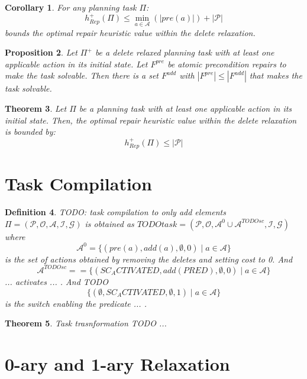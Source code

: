 \documentclass[twocolumn]{article}
\newcommand{\task}{\ensuremath{\Pi}\xspace}
\newcommand{\preds}{\ensuremath{\mathcal{P}}\xspace}
\newcommand{\acts}{\ensuremath{\mathcal{A}}\xspace}
\newcommand{\objects}{\ensuremath{\mathcal{O}}\xspace}
\newcommand{\init}{\ensuremath{\mathcal{I}}\xspace}
\newcommand{\goal}{\ensuremath{\mathcal{G}}\xspace}
\newcommand{\prename}{\ensuremath{pre}\xspace}
\newcommand{\addname}{\ensuremath{add}\xspace}
\newcommand{\pre}[1]{\ensuremath{\prename(#1)}\xspace}
\newcommand{\add}[1]{\ensuremath{\addname(#1)}\xspace}
\newcommand{\arity}[1]{\ensuremath{|#1|}}
\newcommand{\fixPre}{\ensuremath{F^{\prename}}\xspace}
\newcommand{\fixAdd}{\ensuremath{F^{\addname}}\xspace}
\newcommand{\someAct}{\ensuremath{a}\xspace}
\newcommand{\optimalHeuristicRel}{\ensuremath{h^{+}_{Rep}}\xspace}
\newcommand{\relaxedTask}{\ensuremath{\task^{+}}\xspace}
\newtheorem{theorem}{Theorem}
\newtheorem{proposition}[theorem]{Proposition}
\newtheorem{corollary}[theorem]{Corollary}
\newtheorem{definition}[theorem]{Definition}
\begin{document}
	
	\begin{corollary}
		For any planning task \task:
		$$\optimalHeuristicRel(\task) \leq \min_{\someAct \in \acts}(\arity{\pre{\someAct}}) + \arity{\preds}$$
		bounds the optimal repair heuristic value within the delete relaxation.
	\end{corollary}
	
	\begin{proposition}
		Let \relaxedTask be a delete relaxed planning task with at least one applicable action in its initial state.
		Let \fixPre be atomic precondition repairs to make the task solvable.
		Then there is a set \fixAdd with $\arity{\fixPre} \leq \arity{\fixAdd}$ that makes the task solvable.
	\end{proposition}
	
	
	\begin{theorem}
		Let \task be a planning task with at least one applicable action in its initial state.
		Then, the optimal repair heuristic value within the delete relaxation is bounded by:
		$$\optimalHeuristicRel(\task) \leq  \arity{\preds}$$
	\end{theorem}
	
	
	
	\section{Task Compilation}
	
	
	\begin{definition}
		
		TODO: task compilation to only add elements 
		$\task = (\preds, \objects, \acts, \init, \goal)$
		is obtained as
		$TODOtask = (\preds, \objects, \acts^0 \cup \acts^{TODOsc}, \init, \goal)$
		where 
		$$
		\acts^0 = \{
		(\pre{\someAct}, \add{\someAct}, \emptyset, 0) \mid \someAct \in \acts
		\}
		$$
		is the set of actions obtained by removing the deletes and setting cost to 0.
		And 
		$$
		\acts^{TODOsc} = 
		= \{
		(SC_ACTIVATED, \add{PRED}, \emptyset, 0) \mid \someAct \in \acts
		\}$$
		... activates ... .
		And TODO
		$$
		 \{
		(\emptyset, SC_ACTIVATED, \emptyset, 1) \mid \someAct \in \acts
		\}
		$$
		is the switch enabling the predicate ... .
	\end{definition}
	
	\begin{theorem}
		Task trasnformation TODO ... 
	\end{theorem}
	
	
	
	\section{0-ary and 1-ary Relaxation}
	
\end{document}
